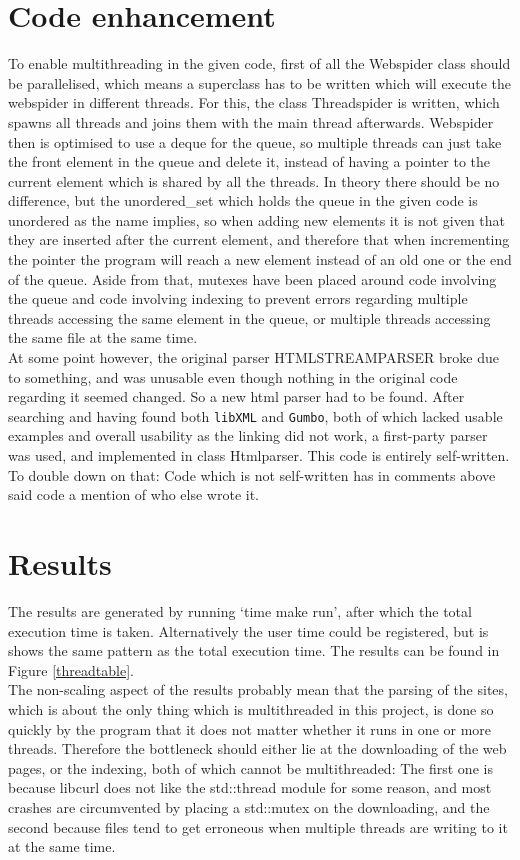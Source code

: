 \documentclass{sig-alternate-05-2015}
\begin{document}
\section{Code enhancement}
To enable multithreading in the given code, first of all the Webspider class should be parallelised, which means a superclass has to be written which will execute the webspider in different threads. For this, the class Threadspider is written, which spawns all threads and joins them with the main thread afterwards. Webspider then is optimised to use a deque for the queue, so multiple threads can just take the front element in the queue and delete it, instead of having a pointer to the current element which is shared by all the threads. In theory there should be no difference, but the unordered\_set which holds the queue in the given code is unordered as the name implies, so when adding new elements it is not given that they are inserted after the current element, and therefore that when incrementing the pointer the program will reach a new element instead of an old one or the end of the queue. Aside from that, mutexes have been placed around code involving the queue and code involving indexing to prevent errors regarding multiple threads accessing the same element in the queue, or multiple threads accessing the same file at the same time.\\
At some point however, the original parser HTMLSTREAMPARSER broke due to something, and was unusable even though nothing in the original code regarding it seemed changed. So a new html parser had to be found. After searching and having found both \verb+libXML+ and \verb+Gumbo+, both of which lacked usable examples and overall usability as the linking did not work, a first-party parser was used, and implemented in class Htmlparser. This code is entirely self-written. \\
To double down on that: Code which is not self-written has in comments above said code a mention of who else wrote it.

\FloatBarrier
\section{Results}
The results are generated by running `time make run', after which the total execution time is taken. Alternatively the user time could be registered, but is shows the same pattern as the total execution time. The results can be found in Figure \ref{threadtable}.\\
The non-scaling aspect of the results probably mean that the parsing of the sites, which is about the only thing which is multithreaded in this project, is done so quickly by the program that it does not matter whether it runs in one or more threads. Therefore the bottleneck should either lie at the downloading of the web pages, or the indexing, both of which cannot be multithreaded: The first one is because libcurl does not like the std::thread module for some reason, and most crashes are circumvented by placing a std::mutex on the downloading, and the second because files tend to get erroneous when multiple threads are writing to it at the same time.
\end{document}

